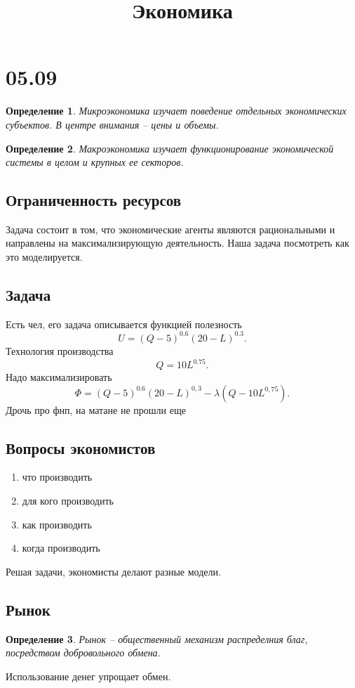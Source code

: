 \documentclass[14pt]{extarticle}
\title{Экономика}
\author{}
\date{}
\newtheorem{definition}{Определение}
\begin{document}
\maketitle
\section{05.09}
\begin{definition}
	Микроэкономика изучает поведение отдельных экономических субъектов.
	В центре внимания -- цены и объемы.
\end{definition}
\begin{definition}
	Макроэкономика изучает функционирование экономической системы в целом и крупных ее секторов.
\end{definition}
\subsection{Ограниченность ресурсов}
Задача состоит в том, что экономические агенты являются рациональными и направлены на максимализирующую деятельность. Наша задача посмотреть как это моделируется.
\subsection{Задача}
Есть чел, его задача описывается функцией полезность
\[
	U = (Q  - 5)^{0.6} (20 - L)^{0.3}
	.\]
Технология производства
\[
	Q = 10 L^{0.75}
	.\]
Надо максимализировать
\[
	\Phi = (Q - 5)^{0.6} (20 - L)^{0,3} - \lambda (Q - 10 L^{0,75})
	.\]
Дрочь про фнп, на матане не прошли еще
\subsection{Вопросы экономистов}
\begin{enumerate}
	\item что производить
	\item для кого производить
	\item как производить
	\item когда производить
\end{enumerate}
Решая задачи, экономисты делают разные модели.
\subsection{Рынок}
\begin{definition}
	Рынок -- общественный механизм распределния благ, посредством добровольного обмена.
\end{definition}
Использование денег упрощает обмен.
\end{document}

